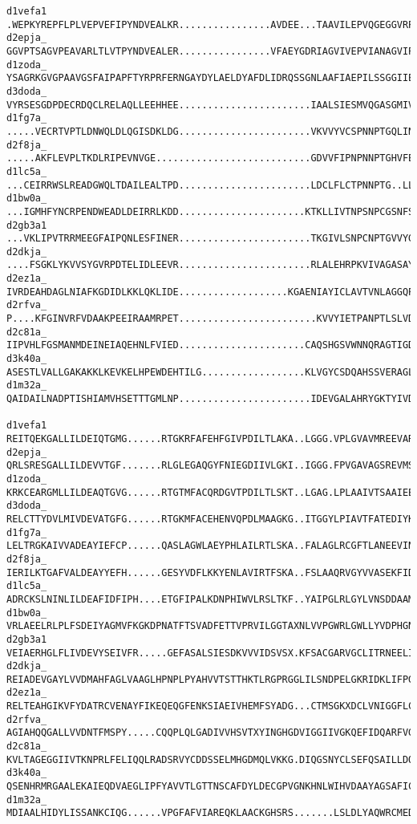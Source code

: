 \begin{lstlisting}[basicstyle=\scriptsize\ttfamily, caption=MSA c.67.1,label=abbMSA67]
d1vefa1 .WEPKYREPFLPLVEPVEFIPYNDVEALKR................AVDEE...TAAVILEPVQGEGGVRPATPEFLRAA
d2epja_ GGVPTSAGVPEAVARLTLVTPYNDVEALER................VFAEYGDRIAGVIVEPVIANAGVIPPRREFLAAL
d1zoda_ YSAGRKGVGPAAVGSFAIPAPFTYRPRFERNGAYDYLAELDYAFDLIDRQSSGNLAAFIAEPILSSGGIIELPDGYMAAL
d3doda_ VYRSESGDPDECRDQCLRELAQLLEEHHEE.......................IAALSIESMVQGASGMIVMPEGYLAGV
d1fg7a_ .....VECRTVPTLDNWQLDLQGISDKLDG.......................VKVVYVCSPNNPTGQLINPQD..FRTL
d2f8ja_ .....AKFLEVPLTKDLRIPEVNVGE...........................GDVVFIPNPNNPTGHVFEREE......
d1lc5a_ ...CEIRRWSLREADGWQLTDAILEALTPD.......................LDCLFLCTPNNPTG..LLPERPLLQAI
d1bw0a_ ...IGMHFYNCRPENDWEADLDEIRRLKDD......................KTKLLIVTNPSNPCGSNFSRKH..VEDI
d2gb3a1 ...VKLIPVTRRMEEGFAIPQNLESFINER.......................TKGIVLSNPCNPTGVVYGKDE..MRYL
d2dkja_ ....FSGKLYKVVSYGVRPDTELIDLEEVR.......................RLALEHRPKVIVAGASAYPRFWDFKAF
d2ez1a_ IVRDEAHDAGLNIAFKGDIDLKKLQKLIDE...................KGAENIAYICLAVTVNLAGGQPVSMANMRAV
d2rfva_ P....KFGINVRFVDAAKPEEIRAAMRPET........................KVVYIETPANPTLSLVDIET.....V
d2c81a_ IIPVHLFGSMANMDEINEIAQEHNLFVIED......................CAQSHGSVWNNQRAGTIGDIGAFSCQQG
d3k40a_ ASESTLVALLGAKAKKLKEVKELHPEWDEHTILG..................KLVGYCSDQAHSSVERAGLLGGVKLRSV
d1m32a_ QAIDAILNADPTISHIAMVHSETTTGMLNP.......................IDEVGALAHRYGKTYIVDAMSSFGGIP

d1vefa1 REITQEKGALLILDEIQTGMG......RTGKRFAFEHFGIVPDILTLAKA..LGGG.VPLGVAVMREEVARSMPKGG...
d2epja_ QRLSRESGALLILDEVVTGF.......RLGLEGAQGYFNIEGDIIVLGKI..IGGG.FPVGAVAGSREVMSLLTPQGK..
d1zoda_ KRKCEARGMLLILDEAQTGVG......RTGTMFACQRDGVTPDILTLSKT..LGAG.LPLAAIVTSAAIEERAHELG...
d3doda_ RELCTTYDVLMIVDEVATGFG......RTGKMFACEHENVQPDLMAAGKG..ITGGYLPIAVTFATEDIYKAFYDDYENL
d1fg7a_ LELTRGKAIVVADEAYIEFCP......QASLAGWLAEYPHLAILRTLSKA..FALAGLRCGFTLANEEVINLL.......
d2f8ja_ IERILKTGAFVALDEAYYEFH......GESYVDFLKKYENLAVIRTFSKA..FSLAAQRVGYVVASEKFIDAYN......
d1lc5a_ ADRCKSLNINLILDEAFIDFIPH....ETGFIPALKDNPHIWVLRSLTKF..YAIPGLRLGYLVNSDDAAMARMR.....
d1bw0a_ VRLAEELRLPLFSDEIYAGMVFKGKDPNATFTSVADFETTVPRVILGGTAXNLVVPGWRLGWLLYVDPHGNGPSFLEG..
d2gb3a1 VEIAERHGLFLIVDEVYSEIVFR.....GEFASALSIESDKVVVIDSVSX.KFSACGARVGCLITRNEELISHAMKLA..
d2dkja_ REIADEVGAYLVVDMAHFAGLVAAGLHPNPLPYAHVVTSTTHKTLRGPRGGLILSNDPELGKRIDKLIFPGIQGGP....
d2ez1a_ RELTEAHGIKVFYDATRCVENAYFIKEQEQGFENKSIAEIVHEMFSYADG...CTMSGKXDCLVNIGGFLCMNDDEMFSS
d2rfva_ AGIAHQQGALLVVDNTFMSPY.....CQQPLQLGADIVVHSVTXYINGHGDVIGGIIVGKQEFIDQARFVGLKDITGGCM
d2c81a_ KVLTAGEGGIIVTKNPRLFELIQQLRADSRVYCDDSSELMHGDMQLVKKG.DIQGSNYCLSEFQSAILLDQLQELDDK..
d3k40a_ QSENHRMRGAALEKAIEQDVAEGLIPFYAVVTLGTTNSCAFDYLDECGPVGNKHNLWIHVDAAYAGSAFICPEYRHLMKG
d1m32a_ MDIAALHIDYLISSANKCIQG......VPGFAFVIAREQKLAACKGHSRS.......LSLDLYAQWRCMEDNHG......


\end{lstlisting}
